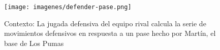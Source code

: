 \newpage
\begin{landscape}

\begin{figure}[h!]
   \texttt{[image: imagenes/defender-pase.png]}
   \caption{Contexto: La jugada defensiva del equipo rival calcula la serie de movimientos defensivos en respuesta a un pase hecho por Martín, el base de Los Pumas}
\end{figure}

\end{landscape}
\newpage


